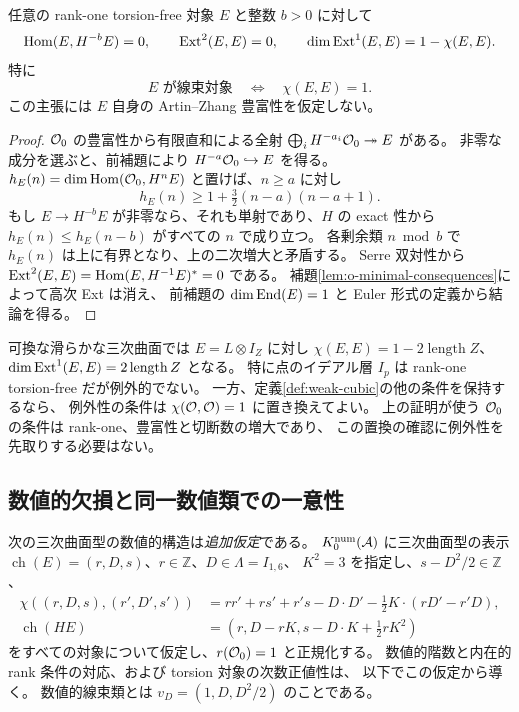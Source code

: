\begin{theorem}[内在的な線束判定]\label{thm:intrinsic-line-criterion}
任意の rank-one torsion-free 対象 $E$ と整数 $b>0$ に対して
\[
 \operatorname{Hom}(E,H^{-b}E)=0,\qquad \operatorname{Ext}^2(E,E)=0,
 \qquad \dim\operatorname{Ext}^1(E,E)=1-\chi(E,E).
\]
特に
\begin{equation}\label{eq:intrinsic-line-criterion}
 E\text{ が線束対象}\quad\Longleftrightarrow\quad\chi(E,E)=1.
\end{equation}
この主張には $E$ 自身の Artin--Zhang 豊富性を仮定しない。
\end{theorem}
\begin{proof}
$\mathcal O_0$ の豊富性から有限直和による全射
$\bigoplus_i H^{-a_i}\mathcal O_0\twoheadrightarrow E$ がある。
非零な成分を選ぶと、前補題により $H^{-a}\mathcal O_0\hookrightarrow E$ を得る。
$h_E(n)=\dim\operatorname{Hom}(\mathcal O_0,H^nE)$ と置けば、$n\ge a$ に対し
\[
 h_E(n)\ge 1+\tfrac32(n-a)(n-a+1).
\]
もし $E\to H^{-b}E$ が非零なら、それも単射であり、$H$ の exact 性から
$h_E(n)\le h_E(n-b)$ がすべての $n$ で成り立つ。
各剰余類 $n\bmod b$ で $h_E(n)$ は上に有界となり、上の二次増大と矛盾する。
Serre 双対性から
$\operatorname{Ext}^2(E,E)=\operatorname{Hom}(E,H^{-1}E)^*=0$ である。
補題\ref{lem:o-minimal-consequences}によって高次 Ext は消え、
前補題の $\dim\operatorname{End}(E)=1$ と Euler 形式の定義から結論を得る。
\end{proof}

\begin{remark}
可換な滑らかな三次曲面では $E=L\otimes I_Z$ に対し
$\chi(E,E)=1-2\operatorname{length}Z$、
$\dim\operatorname{Ext}^1(E,E)=2\operatorname{length}Z$ となる。
特に点のイデアル層 $I_p$ は rank-one torsion-free だが例外的でない。
一方、定義\ref{def:weak-cubic}の他の条件を保持するなら、
例外性の条件は $\chi(\mathcal O,\mathcal O)=1$ に置き換えてよい。
上の証明が使う $\mathcal O_0$ の条件は rank-one、豊富性と切断数の増大であり、
この置換の確認に例外性を先取りする必要はない。
\end{remark}

\subsection{数値的欠損と同一数値類での一意性}
次の三次曲面型の数値的構造は\emph{追加仮定}である。
$K_0^{\rm num}(\mathcal A)$ に三次曲面型の表示
$\operatorname{ch}(E)=(r,D,s)$、$r\in\mathbb Z$、$D\in\Lambda=I_{1,6}$、
$K^2=3$ を指定し、$s-D^2/2\in\mathbb Z$、
\begin{align}
 \chi((r,D,s),(r',D',s'))
 &=rr'+rs'+r's-D\cdot D'
   -\tfrac12 K\cdot(rD'-r'D),\label{eq:line-rr}\\
 \operatorname{ch}(HE)
 &=(r,D-rK,s-D\cdot K+\tfrac12rK^2)\label{eq:line-H}
\end{align}
をすべての対象について仮定し、$r(\mathcal O_0)=1$ と正規化する。
数値的階数と内在的 rank 条件の対応、および torsion 対象の次数正値性は、
以下でこの仮定から導く。
数値的線束類とは $v_D=(1,D,D^2/2)$ のことである。

